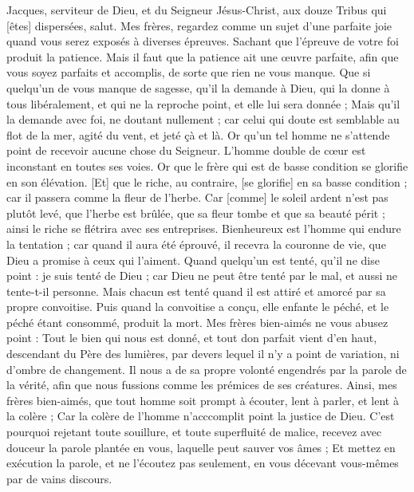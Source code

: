 \BFont
\begin{multicols}{2}
\VerseOne{}Jacques, serviteur de Dieu, et du Seigneur Jésus-Christ, aux douze Tribus qui [êtes] dispersées, salut.
Mes frères, regardez comme un sujet d'une parfaite joie quand vous serez exposés à diverses épreuves.
Sachant que l'épreuve de votre foi produit la patience.
Mais il faut que la patience ait une œuvre parfaite, afin que vous soyez parfaits et accomplis, de sorte que rien ne vous manque.
Que si quelqu'un de vous manque de sagesse, qu'il la demande à Dieu, qui la donne à tous libéralement, et qui ne la reproche point, et elle lui sera donnée ;
Mais qu'il la demande avec foi, ne doutant nullement ; car celui qui doute est semblable au flot de la mer, agité du vent, et jeté çà et là.
Or qu'un tel homme ne s'attende point de recevoir aucune chose du Seigneur.
L'homme double de cœur est inconstant en toutes ses voies.
Or que le frère qui est de basse condition se glorifie en son élévation.
[Et] que le riche, au contraire, [se glorifie] en sa basse condition ; car il passera comme la fleur de l'herbe.
Car [comme] le soleil ardent n'est pas plutôt levé, que l'herbe est brûlée, que sa fleur tombe et que sa beauté périt ; ainsi le riche se flétrira avec ses entreprises.
Bienheureux est l'homme qui endure la tentation ; car quand il aura été éprouvé, il recevra la couronne de vie, que Dieu a promise à ceux qui l'aiment.
Quand quelqu'un est tenté, qu'il ne dise point : je suis tenté de Dieu ; car Dieu ne peut être tenté par le mal, et aussi ne tente-t-il personne.
Mais chacun est tenté quand il est attiré et amorcé par sa propre convoitise.
Puis quand la convoitise a conçu, elle enfante le péché, et le péché étant consommé, produit la mort.
Mes frères bien-aimés ne vous abusez point :
Tout le bien qui nous est donné, et tout don parfait vient d'en haut, descendant du Père des lumières, par devers lequel il n'y a point de variation, ni d'ombre de changement.
Il nous a de sa propre volonté engendrés par la parole de la vérité, afin que nous fussions comme les prémices de ses créatures.
Ainsi, mes frères bien-aimés, que tout homme soit prompt à écouter, lent à parler, et lent à la colère ;
Car la colère de l'homme n'acccomplit point la justice de Dieu.
C'est pourquoi rejetant toute souillure, et toute superfluité de malice, recevez avec douceur la parole plantée en vous, laquelle peut sauver vos âmes ;
Et mettez en exécution la parole, et ne l'écoutez pas seulement, en vous décevant vous-mêmes par de vains discours.

\end{multicols}
